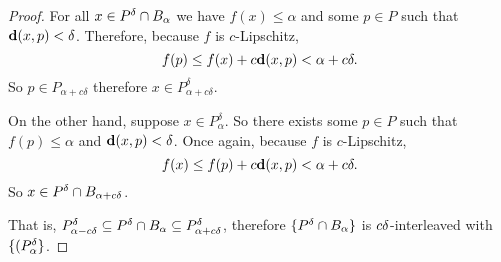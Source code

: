 \begin{proof}
  For all $x\in \P\cap B_\alpha$ we have $f(x)\leq \alpha$ and some $p\in P$ such that $\dist(x, p) < \of$.
  Therefore, because $f$ is $c$-Lipschitz,
  \[ f(p)\leq f(x) + c\dist(x, p) < \alpha + c\delta.\]
  So $p\in P_{\alpha + c\delta}$ therefore $x\in P_{\alpha+c\delta}^\delta$.

  On the other hand, suppose $x\in P_\alpha^\delta$.
  So there exists some $p\in P$ such that $f(p)\leq \alpha$ and $\dist(x, p) < \delta$.
  Once again, because $f$ is $c$-Lipschitz,
  \[ f(x)\leq f(p)+c\dist(x, p) < \alpha + c\of. \]
  So $x\in \P\cap B_{\alpha+c\delta}$.

  That is, $P_{\alpha-c\delta}^\delta\subseteq \P\cap B_\alpha\subseteq P_{\alpha + c\delta}^\delta$, therefore $\{\P\cap B_\alpha\}$ is $c\of$-interleaved with $\{(P_\alpha^\of\}$.
%

\end{proof}
